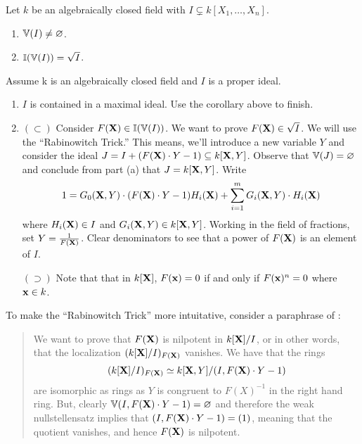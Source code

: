 \documentclass{ximera}
\begin{document}
\begin{theorem}[Nullstellensatz]
  Let $k$ be an algebraically closed field with $I \subsetneq k[X_1,\dots,X_n]$.
  \begin{enumerate}
  \item $\mathbb V(I) \ne \varnothing$.
  \item $\mathbb I(\mathbb V(I)) = \sqrt{I}$.
  \end{enumerate}
\begin{sketch}
Assume k is an algebraically closed field and $I$ is a proper ideal.
  \begin{enumerate}
    \item $I$ is contained in a maximal ideal. Use the corollary above
      to finish.
    \item $(\subset)$ Consider $F(\mathbf X)\in\mathbb I(\mathbb V(I))$. We want to prove
      $F(\mathbf X)\in\sqrt{I}$. We will use the ``Rabinowitch Trick.'' This
      means, we'll introduce a new variable $Y$ and consider the ideal
      $J= I + (F(\mathbf X)\cdot Y-1)\subseteq k[\mathbf X,Y]$. Observe that $\mathbb V(J) =
      \varnothing$ and conclude from part (a) that $J=k[\mathbf X,Y]$. Write
      \[
      1= G_0(\mathbf X,Y)\cdot (F(\mathbf X)\cdot Y-1) H_i(\mathbf X) + \sum_{i=1}^m G_i(\mathbf X,Y)
      \cdot H_i(\mathbf X)
      \]
      where $H_i(\mathbf X) \in I$ and $G_i(\mathbf X,Y) \in k[\mathbf X,Y]$.  Working in
      the field of fractions, set $Y=\frac{1}{F(\mathbf X)}$. Clear
      denominators to see that a power of $F(\mathbf X)$ is an element of $I$.

      $(\supset)$ Note that that in $k[\mathbf X]$, $F(\mathbf{x}) = 0$ if and only
      if $F(\mathbf{x})^n = 0$ where $\mathbf{x}\in k$.
  \end{enumerate}
\end{sketch}
\end{theorem}

\begin{remark}%
  To make the ``Rabinowitch Trick'' more intuitative, consider a
  paraphrase of :
\begin{quote}
  We want to prove that $F(\mathbf X)$ is nilpotent in $k[\mathbf X]/I$, or in other
  words, that the localization $(k[\mathbf X]/I)_{F(\mathbf X)}$ vanishes. We have that the rings
  \[
  (k[\mathbf X]/I)_{F(\mathbf X)}\simeq k[\mathbf X,Y]/(I,F(\mathbf X)\cdot Y-1)
  \]
  are isomorphic as rings as $Y$ is congruent to $F(X)^{-1}$ in the
  right hand ring.  But, clearly $\mathbb V(I,F(\mathbf X)\cdot Y-1)=\varnothing$ and
  therefore the weak nullstellensatz implies that $(I,F(\mathbf X)\cdot
  Y-1)=(1)$, meaning that the quotient vanishes, and hence $F(\mathbf X)$ is
  nilpotent.
\end{quote}
\end{remark}
\end{document}

